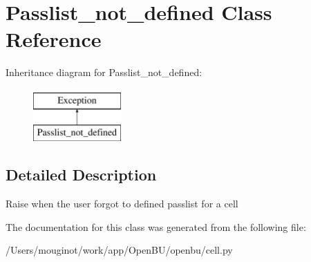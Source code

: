 \hypertarget{classopenbu_1_1cell_1_1_passlist__not__defined}{}\section{Passlist\+\_\+not\+\_\+defined Class Reference}
\label{classopenbu_1_1cell_1_1_passlist__not__defined}
Inheritance diagram for Passlist\+\_\+not\+\_\+defined\+:\begin{figure}[H]
\begin{center}
\leavevmode
\includegraphics[height=2.000000cm]{classopenbu_1_1cell_1_1_passlist__not__defined}
\end{center}
\end{figure}


\subsection{Detailed Description}
\begin{DoxyVerb}Raise when the user forgot to defined passlist for a cell\end{DoxyVerb}
 

The documentation for this class was generated from the following file\+:\begin{DoxyCompactItemize}
\item 
/\+Users/mouginot/work/app/\+Open\+B\+U/openbu/cell.\+py\end{DoxyCompactItemize}
